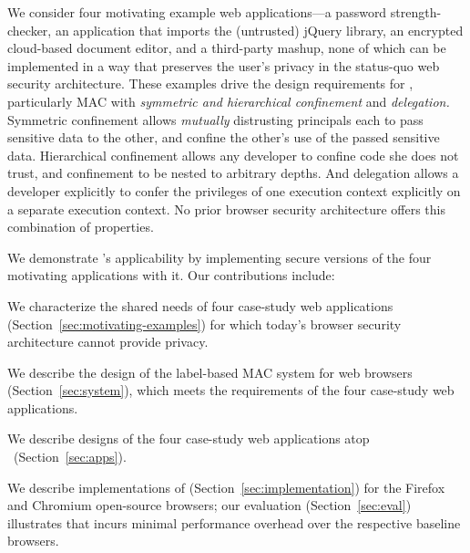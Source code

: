 We consider four motivating example web ap\-pli\-ca\-tions---a
password strength-checker, an application that imports the (untrusted)
jQuery library, an encrypted cloud-based document editor, and a
third-party mashup, none of which can be implemented in a way that
preserves the user's privacy in the status-quo web security
architecture. These examples drive the design requirements for \sys{},
particularly MAC with \emph{symmetric and hierarchical confinement} and
{\em delegation.}  Symmetric confinement allows \emph{mutually}
distrusting principals each to pass sensitive data to the other, and
confine the other's use of the passed sensitive data. Hierarchical
confinement allows any developer to confine code she does not trust,
and confinement to be nested to arbitrary depths. And delegation
allows a developer explicitly to confer the privileges of one execution
context explicitly on a separate execution context.
%
No prior browser security architecture offers this combination of
properties.

We demonstrate \sys{}'s applicability by implementing
secure versions of the four motivating applications with it.
Our contributions include:

\begin{CompactItemize}
\item We characterize the shared needs of four case-study web applications
  (Section~\ref{sec:motivating-examples}) for which today's browser
  security architecture cannot provide privacy.
\item We describe the design of the \sys{} label-based MAC system
  for web browsers (Section~\ref{sec:system}), which meets the
  requirements of the four case-study web applications.
\item We describe designs of the four case-study web applications atop
  \sys~(Section~\ref{sec:apps}).
\item We describe implementations of \sys{}
  (Section~\ref{sec:implementation}) for the Firefox and Chromium
  open-source browsers; our evaluation (Section~\ref{sec:eval})
  illustrates that \sys{} incurs minimal performance overhead over the
  respective baseline browsers.
\end{CompactItemize}

